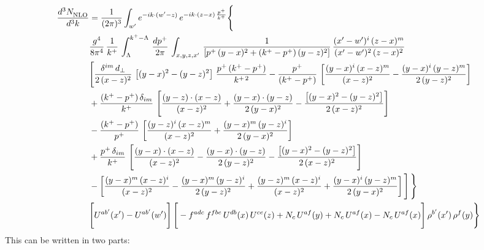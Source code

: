\documentclass[9pt]{article}
\numberwithin{equation}{section}
\begin{document}
\begin{align}
    \frac{d^{3}N_{\rm NLO}^{\rm}}{d^{3}k}  & =  \frac{1}{(2\pi)^{3}}  \int_{ w^\prime} e^{-ik\cdot(w'-z)}\,e^{-ik\cdot (z-x)\,\frac{p^{+}}{k^{+}}} \Bigg\{\notag \\ & \frac{g^{4}}{8\pi^{4}}\,\frac{1}{k^{+}}\,\int_{\Lambda}^{k^{+}-\Lambda}\, \frac{dp^{+}}{2\pi} \, \int_{x,y,z,x'}\,\frac{1}{\left[p^{+}\,(y-x)^{2}+(k^{+}-p^{+})\,(y-z)^{2}\right]}\, \frac{(x'-w')^{i}\,(z-x)^{m}}{(x'-w')^{2}\,(z-x)^{2}} \notag \\ & \Bigg[\frac{\delta^{im}\,d_{\perp}}{2\,(x-z)^{2}}\,\left[(y-x)^{2}-(y-z)^{2}\right]\,\frac{p^{+}\,(k^{+}-p^{+})}{k^{+\,2}}-\frac{p^{+}}{(k^{+}-p^{+})}\,\left[\frac{(y-x)^{i}\,(x-z)^{m}}{(x-z)^{2}}-\frac{(y-x)^{i}\,(y-z)^{m}}{2\,(y-z)^{2}}\right]\notag \\ & +\frac{(k^{+}-p^{+})\,\delta_{im}}{k^{+}}\,\left[\frac{(y-z)\cdot (x-z)}{(x-z)^{2}}+\frac{(y-x)\cdot (y-z)}{2\,(y-x)^{2}}-\frac{\left[(y-x)^{2}-(y-z)^{2}\right]}{2\,(x-z)^{2}}\right]\notag \\ & -\frac{(k^{+}-p^{+})}{p^{+}}\,\left[\frac{(y-z)^{i}\,(x-z)^{m}}{(x-z)^{2}}+\frac{(y-x)^{m}\,(y-z)^{i}}{2\,(y-x)^{2}}\right]\notag \\ & +\frac{p^{+}\,\delta_{im}}{k^{+}}\,\left[\frac{(y-x)\cdot (x-z)}{(x-z)^{2}}-\frac{(y-x)\cdot (y-z)}{2\,(y-z)^{2}}-\frac{\left[(y-x)^{2}-(y-z)^{2}\right]}{2\,(x-z)^{2}}\right]\notag \\ &-\left[\frac{(y-x)^{m}\,(x-z)^{i}}{(x-z)^{2}}-\frac{(y-x)^{m}\,(y-z)^{i}}{2\,(y-z)^{2}}+\frac{(y-z)^{m}\,(x-z)^{i}}{(x-z)^{2}}+\frac{(y-x)^{i}\,(y-z)^{m}}{2\,(y-x)^{2}}\right]\Bigg]\,\Bigg\} \notag \\ & \Bigg[U^{ab'}(x')-U^{ab'}(w')\Bigg]\,\Bigg[-f^{adc}\,f^{fbe}\,U^{db}(x)\,U^{ce}(z)+N_{c}\,U^{af}(y)+N_{c}\,U^{af}(x) -N_{c}\,U^{af}(x)\Bigg]\,\rho^{b'}(x')\,\rho^{f}(y)\Bigg\}
\end{align}
This can be written in two parts: 
\end{document}

